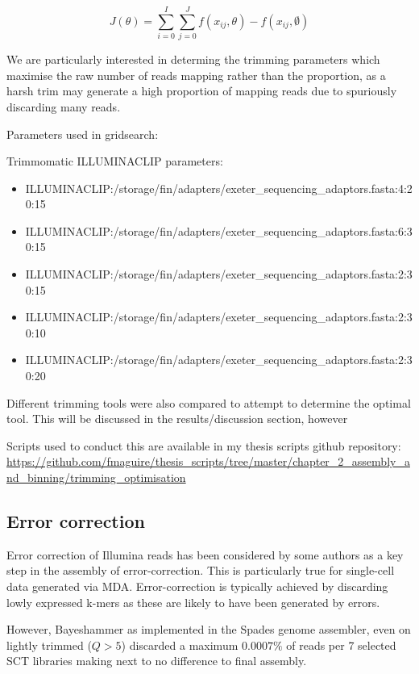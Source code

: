 \[
    J(\theta) = \sum^{I}_{i=0} \sum^{J}_{j=0} f(x_{ij}, \theta) - f(x_{ij}, \emptyset)
\]


We are particularly interested in determing the trimming parameters which maximise the raw number of reads mapping rather than
the proportion, as a harsh trim may generate a high proportion of mapping reads due to spuriously discarding 
many reads.  


Parameters used in gridsearch:

Trimmomatic ILLUMINACLIP parameters: 
\begin{itemize}
    \item ILLUMINACLIP:/storage/fin/adapters/exeter_sequencing_adaptors.fasta:4:20:15
    \item ILLUMINACLIP:/storage/fin/adapters/exeter_sequencing_adaptors.fasta:6:30:15
    \item ILLUMINACLIP:/storage/fin/adapters/exeter_sequencing_adaptors.fasta:2:30:15
    \item ILLUMINACLIP:/storage/fin/adapters/exeter_sequencing_adaptors.fasta:2:30:10
    \item ILLUMINACLIP:/storage/fin/adapters/exeter_sequencing_adaptors.fasta:2:30:20
\end{itemize}


Different trimming tools were also compared to attempt to determine the optimal tool.
This will be discussed in the results/discussion section, however





Scripts used to conduct this are available in my thesis scripts github repository:
\url{https://github.com/fmaguire/thesis_scripts/tree/master/chapter_2_assembly_and_binning/trimming_optimisation}




\subsection{Error correction}

Error correction of Illumina reads has been considered by some authors as a key
step in the assembly of error-correction.  This is particularly true for single-cell
data generated via MDA. 
Error-correction is typically achieved by discarding lowly expressed k-mers 
as these are likely to have been generated by errors.



However, Bayeshammer as implemented in the Spades genome assembler, even on lightly trimmed
(\(Q>5\)) discarded a maximum \(0.0007\%\) of reads per 7 selected SCT libraries 
making next to no difference to final assembly.


